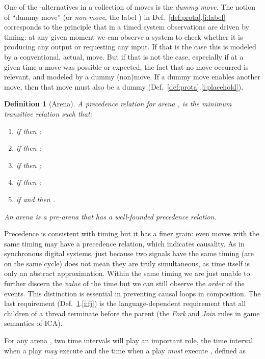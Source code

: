 \documentclass{article}
\newtheorem{definition}[theorem]{Definition}
\begin{document}
One of the -alternatives in a collection of moves is the \emph{dummy move}.
The notion of ``dummy move'' (or \emph{non-move}, the label ) in Def.~\ref{def:prota}.\ref{i:label} corresponds to the principle that in a timed system observations are driven by timing: at any given moment we can observe a system to check whether it is producing any output or requesting any input. If that is the case this is modeled by a conventional, actual, move. But if that is not the case, especially if at a given time a move was possible or expected, the fact that no move occurred is relevant, and modeled by a dummy (non)move. If a dummy move enables another move, then that move must also be a dummy (Def.~\ref{def:prota}.\ref{i:placehold}). 

\begin{definition}[Arena]\label{def:arena}
	A \emph{precedence relation for arena} ,  is the minimum transitive relation such that:
\begin{enumerate}
\item if  then ;
\item if  then ;\label{def:arenat}
\item if  then ;
\item if  then ;
\item \label{i:fj} if  and  then .
\end{enumerate}
	An \emph{arena} is a pre-arena that has a well-founded precedence relation. 
\end{definition}
Precedence is consistent with timing but it has a finer grain: even moves with the same timing may have a precedence relation, which indicates causality. As in synchronous digital systems, just because two signals have the same timing (are on the same cycle) does not mean they are truly simultaneous, as time itself is only an abstract approximation. Within the same timing we are just unable to further discern the \emph{value} of the time but we can still observe the \emph{order} of the events. This distinction is essential in preventing causal loops in composition. The last requirement (Def.~\ref{def:arena}.\ref{i:fj}) is the language-dependent requirement that all children of a thread terminate before the parent (the \emph{Fork} and \emph{Join} rules in game semantics of ICA).

For any arena , two time intervals will play an important role, the time interval when a play \emph{may} execute  and the time when a play \emph{must} execute , defined as
\end{document}
